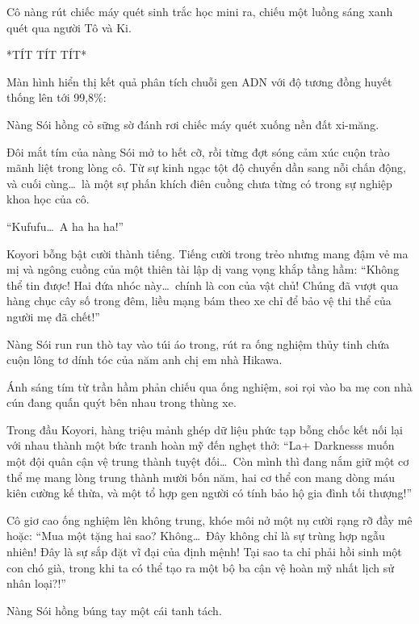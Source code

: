 \documentclass[../main.tex]{subfiles}
\begin{document}
Cô nàng rút chiếc máy quét sinh trắc học mini ra, chiếu một luồng sáng xanh quét qua người Tô và Ki.

*TÍT TÍT TÍT*

Màn hình hiển thị kết quả phân tích chuỗi gen ADN với độ tương đồng huyết thống lên tới 99,8\%:


Nàng Sói hồng cỏ sững sờ đánh rơi chiếc máy quét xuống nền đất xi-măng.

Đôi mắt tím của nàng Sói mở to hết cỡ, rồi từng đợt sóng cảm xúc cuộn trào mãnh liệt trong lòng cô. Từ sự kinh ngạc tột độ chuyển dần sang nỗi chấn động, và cuối cùng\dots\ là một sự phấn khích điên cuồng chưa từng có trong sự nghiệp khoa học của cô.

``Kufufu\dots\ A ha ha ha!''

Koyori bỗng bật cười thành tiếng. Tiếng cười trong trẻo nhưng mang đậm vẻ ma mị và ngông cuồng của một thiên tài lập dị vang vọng khắp tầng hầm: ``Không thể tin được! Hai đứa nhóc này\dots\ chính là con của vật chủ! Chúng đã vượt qua hàng chục cây số trong đêm, liều mạng bám theo xe chỉ để bảo vệ thi thể của người mẹ đã chết!''

Nàng Sói run run thò tay vào túi áo trong, rút ra ống nghiệm thủy tinh chứa cuộn lông tơ dính tóc của năm anh chị em nhà Hikawa.

Ánh sáng tím từ trần hầm phản chiếu qua ống nghiệm, soi rọi vào ba mẹ con nhà cún đang quấn quýt bên nhau trong thùng xe.

Trong đầu Koyori, hàng triệu mảnh ghép dữ liệu phức tạp bỗng chốc kết nối lại với nhau thành một bức tranh hoàn mỹ đến nghẹt thở: ``La+ Darknesss muốn một đội quân cận vệ trung thành tuyệt đối\dots\ Còn mình thì đang nắm giữ một cơ thể mẹ mang lòng trung thành mười bốn năm, hai cơ thể con mang dòng máu kiên cường kế thừa, và một tổ hợp gen người có tính bảo hộ gia đình tối thượng!''

Cô giơ cao ống nghiệm lên không trung, khóe môi nở một nụ cười rạng rỡ đầy mê hoặc: ``Mua một tặng hai sao? Không\dots\ Đây không chỉ là sự trùng hợp ngẫu nhiên! Đây là sự sắp đặt vĩ đại của định mệnh! Tại sao ta chỉ phải hồi sinh một con chó già, trong khi ta có thể tạo ra một bộ ba cận vệ hoàn mỹ nhất lịch sử nhân loại?!''

Nàng Sói hồng búng tay một cái tanh tách.
\end{document}
